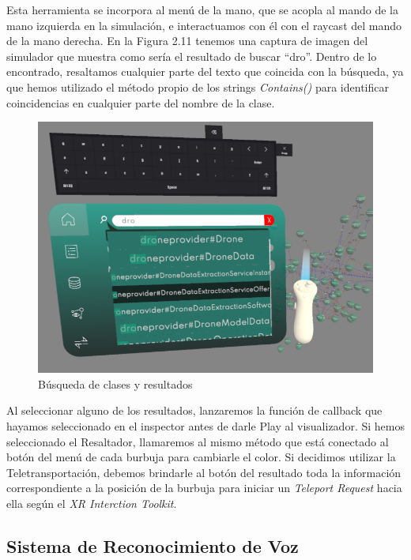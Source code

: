Esta herramienta se incorpora al menú de la mano, que se acopla al mando de la mano izquierda en la simulación, e interactuamos con él con el raycast del mando de la mano derecha.
En la Figura 2.11 tenemos una captura de imagen del simulador que muestra como sería el resultado de buscar ``dro''. Dentro de lo encontrado, resaltamos cualquier parte del texto que coincida con la búsqueda, ya que hemos utilizado el método propio de los strings \textit{Contains()} para identificar coincidencias en cualquier parte del nombre de la clase.

\begin{figure}[ht]
   \begin{center}
      \includegraphics[width=0.7\linewidth]{chapter2/figures/searchtool.png}
   \end{center}
   \caption[Búsqueda de clases y resultados]
   {\footnotesize Búsqueda de clases y resultados}
\end{figure}

Al seleccionar alguno de los resultados, lanzaremos la función de callback que hayamos seleccionado en el inspector antes de darle Play al visualizador. Si hemos seleccionado el Resaltador, llamaremos al mismo método que está conectado al botón del menú de cada burbuja para cambiarle el color. Si decidimos utilizar la Teletransportación, debemos brindarle al botón del resultado toda la información correspondiente a la posición de la burbuja para iniciar un \textit{Teleport Request} hacia ella según el \textit{XR Interction Toolkit}.



\subsection{Sistema de Reconocimiento de Voz}

